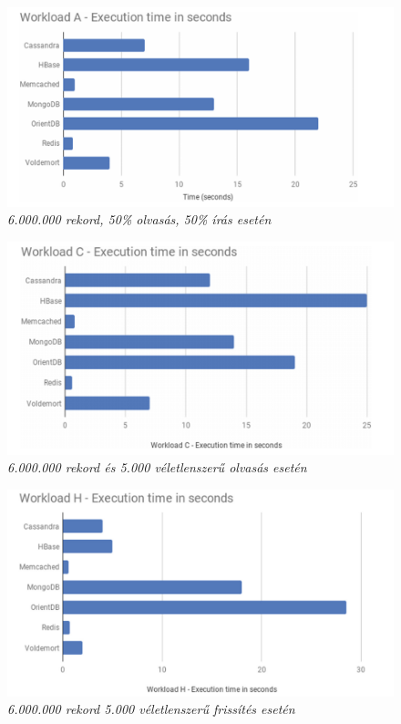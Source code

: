 \begin{figure}[H]
	\centering
	\includegraphics[width=0.9\linewidth]{figures/images/performance_a.png}
	\caption[6.000.000 rekord, 50\% olvasás, 50\% írás esetén]{\textit{6.000.000 rekord, 50\% olvasás, 50\% írás esetén}\footnotemark}
	\label{fig:performance_a}
\end{figure}


\begin{figure}[H]
	\centering
	\includegraphics[width=0.9\linewidth]{figures/images/performance_b.png}
	\caption[6.000.000 rekord és 5.000 véletlenszerű olvasás esetén]{\textit{6.000.000 rekord és 5.000 véletlenszerű olvasás esetén}\footnotemark}
	\label{fig:performance_b}
\end{figure}


\begin{figure}[H]
	\centering
	\includegraphics[width=0.9\linewidth]{figures/images/performance_c.png}
	\caption[6.000.000 rekord 5.000 véletlenszerű frissítés esetén]{\textit{6.000.000 rekord 5.000 véletlenszerű frissítés esetén}\footnotemark}
	\label{fig:performance_c}
\end{figure}

